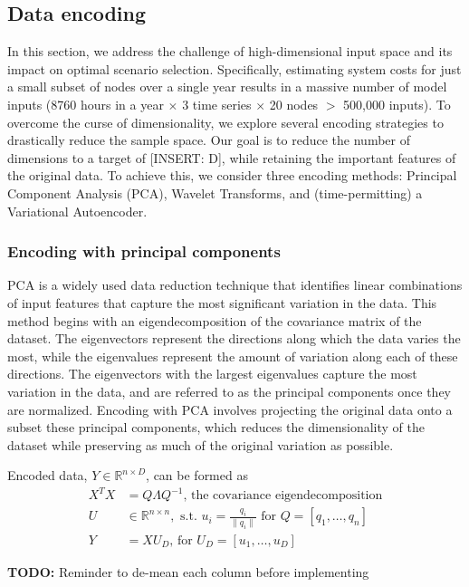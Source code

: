 \documentclass[10pt,twocolumn,letterpaper]{article}
\begin{document}
\subsection{Data encoding}
In this section, we address the challenge of high-dimensional input space and its impact on optimal scenario selection. Specifically, estimating system costs for just a small subset of nodes over a single year results in a massive number of model inputs (8760 hours in a year $\times$ 3 time series $\times$ 20 nodes $>$ 500,000 inputs). To overcome the curse of dimensionality, we explore several encoding strategies to drastically reduce the sample space. Our goal is to reduce the number of dimensions to a target of [INSERT: D], while retaining the important features of the original data. To achieve this, we consider three encoding methods: Principal Component Analysis (PCA), Wavelet Transforms, and (time-permitting) a Variational Autoencoder.

\subsubsection{Encoding with principal components}
PCA is a widely used data reduction technique that identifies linear combinations of input features that capture the most significant variation in the data. This method begins with an eigendecomposition of the covariance matrix of the dataset. The eigenvectors represent the directions along which the data varies the most, while the eigenvalues represent the amount of variation along each of these directions. The eigenvectors with the largest eigenvalues capture the most variation in the data, and are referred to as the principal components once they are normalized. Encoding with PCA involves projecting the original data onto a subset these principal components, which reduces the dimensionality of the dataset while preserving as much of the original variation as possible.

Encoded data, $Y \in \mathbb{R}^{n\times D}$, can be formed as 
\begin{align*}
    X^TX &= Q\Lambda Q^{-1} \textrm{, the covariance eigendecomposition}\\
    U &\in \mathbb{R}^{n\times n}, \textrm{ s.t. } u_i = \frac{q_i}{\lVert q_i \rVert} \textrm{ for } Q = [q_1, \dots, q_n]\\
    Y &= XU_D \textrm{, for } U_D = [u_1, \dots, u_D]
\end{align*}

\textbf{TODO:} Reminder to de-mean each column before implementing
\end{document}
